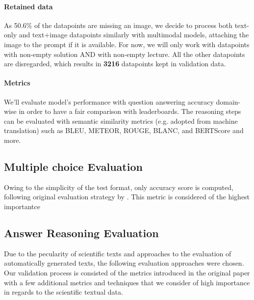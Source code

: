\documentclass[10pt]{article}
\begin{document}
\paragraph{Retained data} As 50.6\% of the datapoints are missing an image, we decide to process both text-only and text+image datapoints similarly with multimodal models, attaching the image to the prompt if it is available.
For now, we will only work with datapoints with non-empty solution AND with non-empty lecture. All the other datapoints are disregarded,
which results in \textbf{3216} datapoints kept in validation data.  

\paragraph{Metrics}
We'll evaluate model's performance with question answering accuracy domain-wise in order to have a fair comparison with leaderboards. The reasoning steps can be evaluated with semantic similarity metrics (e.g. adopted from machine translation) such as BLEU, METEOR, ROUGE, BLANC, and BERTScore and more.
\subsection{Multiple choice Evaluation}
Owing to the simplicity of the test format, only accuracy score is computed, following original evaluation strategy by \cite{lu2022learn}. This metric is considered of the highest importantce 
\subsection{Answer Reasoning Evaluation}
Due to the pecularity of scientific texts and approaches to the evaluation of automatically generated texts, the following evaluation approaches were chosen. Our validation process is consisted of the metrics introduced in the original paper \cite{lu2022learn}  with a few additional metrics and techniques that we consider of high importance in regards to the scientific textual data.


\end{document}
